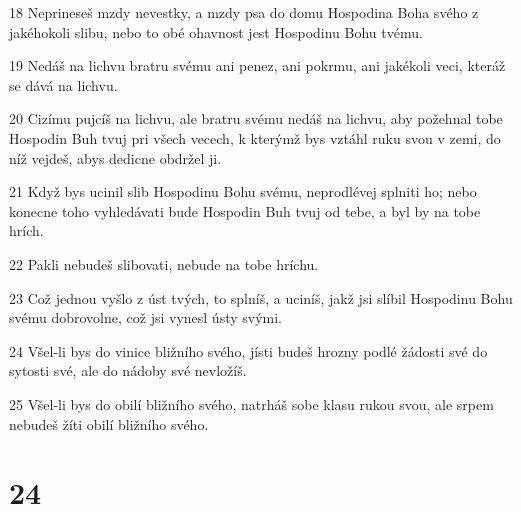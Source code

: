 \par 18 Neprineseš mzdy nevestky, a mzdy psa do domu Hospodina Boha svého z jakéhokoli slibu, nebo to obé ohavnost jest Hospodinu Bohu tvému.
\par 19 Nedáš na lichvu bratru svému ani penez, ani pokrmu, ani jakékoli veci, kteráž se dává na lichvu.
\par 20 Cizímu pujcíš na lichvu, ale bratru svému nedáš na lichvu, aby požehnal tobe Hospodin Buh tvuj pri všech vecech, k kterýmž bys vztáhl ruku svou v zemi, do níž vejdeš, abys dedicne obdržel ji.
\par 21 Když bys ucinil slib Hospodinu Bohu svému, neprodlévej splniti ho; nebo konecne toho vyhledávati bude Hospodin Buh tvuj od tebe, a byl by na tobe hrích.
\par 22 Pakli nebudeš slibovati, nebude na tobe hríchu.
\par 23 Což jednou vyšlo z úst tvých, to splníš, a uciníš, jakž jsi slíbil Hospodinu Bohu svému dobrovolne, což jsi vynesl ústy svými.
\par 24 Všel-li bys do vinice bližního svého, jísti budeš hrozny podlé žádosti své do sytosti své, ale do nádoby své nevložíš.
\par 25 Všel-li bys do obilí bližního svého, natrháš sobe klasu rukou svou, ale srpem nebudeš žíti obilí bližního svého.

\chapter{24}


